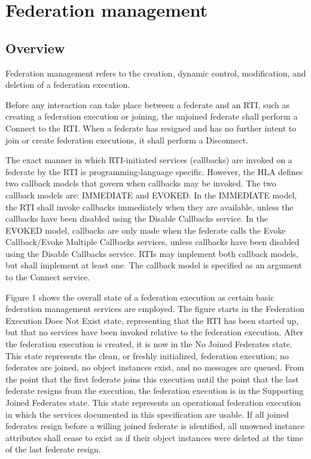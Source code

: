 
\section{Federation management}

\subsection{Overview}

Federation management refers to the creation, dynamic control, modification, and deletion of a federation execution.

Before any interaction can take place between a federate and an RTI, such as creating a federation execution or joining, the unjoined federate shall perform a Connect to the RTI. When a federate has resigned and has no further intent to join or create federation executions, it shall perform a Disconnect.

The exact manner in which RTI-initiated services (callbacks) are invoked on a federate by the RTI is programming-language specific. However, the HLA defines two callback models that govern when callbacks may be invoked. The two callback models are: IMMEDIATE and EVOKED. In the IMMEDIATE model, the RTI shall invoke callbacks immediately when they are available, unless the callbacks have been disabled using the Disable Callbacks service. In the EVOKED model, callbacks are only made when the federate calls the Evoke Callback/Evoke Multiple Callbacks services, unless callbacks have been disabled using the Disable Callbacks service. RTIs may implement both callback models, but shall implement at least one. The callback model is specified as an argument to the Connect service.

Figure 1 shows the overall state of a federation execution as certain basic federation management services are employed. The figure starts in the Federation Execution Does Not Exist state, representing that the RTI has been started up, but that no services have been invoked relative to the federation execution. After the federation execution is created, it is now in the No Joined Federates state. This state represents the clean, or freshly initialized, federation execution; no federates are joined, no object instances exist, and no messages are queued. From the point that the first federate joins this execution until the point that the last federate resigns from the execution, the federation execution is in the Supporting Joined Federates state. This state represents an operational federation execution in which the services documented in this specification are usable. If all joined federates resign before a willing joined federate is identified, all unowned instance attributes shall cease to exist as if their object instances were deleted at the time of the last federate resign.

